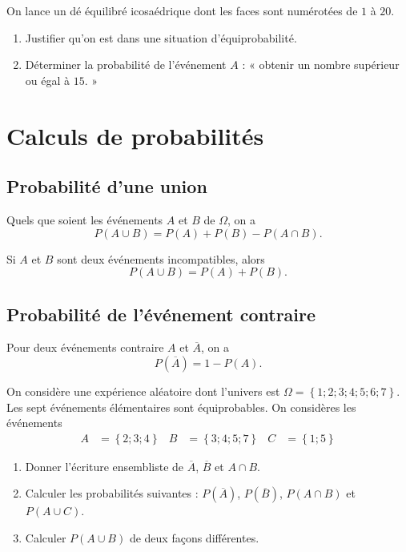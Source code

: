 \documentclass[11pt]{article}
\begin{document}
\begin{app}
  On lance un dé équilibré icosaédrique dont les faces sont numérotées de $1$ à
  $20$.
  \begin{enumerate}
    \item Justifier qu'on est dans une situation d'équiprobabilité.
    \item Déterminer la probabilité de l'événement $A$ : « obtenir un nombre
      supérieur ou égal à $15$. »
  \end{enumerate}
\end{app}

\section{Calculs de probabilités}
\subsection{Probabilité d'une union}

\begin{prop}
  Quels que soient les événements $A$ et $B$ de $\Omega$, on a
  \[
    P\left( A \cup B \right) = P\left( A \right) + P\left( B \right) - P\left(
    A\cap B \right).
  \]
\end{prop}

\begin{prop}
  Si $A$ et $B$ sont deux événements incompatibles, alors
  \[
    P\left( A \cup B \right) = P\left( A \right) + P\left( B \right).
  \]
\end{prop}

\subsection{Probabilité de l'événement contraire}

\begin{prop}
  Pour deux événements contraire $A$ et $\overline A$, on a
  \[
    P\left( \overline A \right) = 1 - P\left( A \right).
  \]
\end{prop}

\begin{app}
  On considère une expérience aléatoire dont l'univers est $\Omega = \left\{
  1; 2; 3; 4; 5; 6; 7 \right\}$. Les sept événements élémentaires sont
  équiprobables. On considères les événements
\begin{align*}
  A &= \left\{ 2; 3; 4 \right\} &
  B &= \left\{3; 4; 5; 7 \right\} &
  C &= \left\{1; 5 \right\}
\end{align*}
\begin{enumerate}
  \item Donner l'écriture ensembliste de $\overline A$, $\overline B$ et $A\cap
    B$.
  \item Calculer les probabilités suivantes : $P\left( \overline A \right)$,
    $P\left( \overline B \right)$, $P(A\cap B)$ et $P(A\cup C)$.
  \item Calculer $P\left( A\cup B \right)$ de deux façons différentes.
\end{enumerate}
\end{app}
\end{document}
